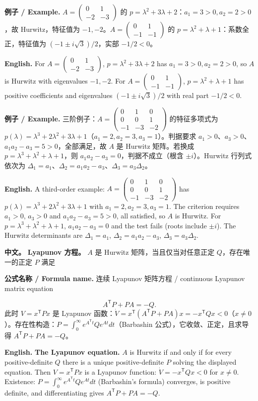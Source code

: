 \documentclass[UTF8,11pt,a4paper]{ctexart}
\newcommand{\EN}[1]{\par\noindent\textbf{English.} #1\par}
\newcommand{\FORMULA}[2]{\par\noindent\textbf{公式名称 / Formula name.} #1 / #2\par}
\newcommand{\EX}[2]{\par\noindent\textbf{例子 / Example.} #1\par\EN{#2}}
\newcommand{\APS}[2]{\par\noindent\textbf{中文。} #1\par\noindent\textbf{English.} #2\par}
\begin{document}
\EX{$A=\begin{pmatrix}0&1\\-2&-3\end{pmatrix}$ 的 $p=\lambda^2+3\lambda+2$：$a_1=3>0,a_2=2>0$，故 Hurwitz，特征值为 $-1,-2$。$A=\begin{pmatrix}0&1\\-1&-1\end{pmatrix}$ 的 $p=\lambda^2+\lambda+1$：系数全正，特征值为 $(-1\pm i\sqrt3)/2$，实部 $-1/2<0$。}{For $A=\begin{pmatrix}0&1\\-2&-3\end{pmatrix}$, $p=\lambda^2+3\lambda+2$ has $a_1=3>0,a_2=2>0$, so $A$ is Hurwitz with eigenvalues $-1,-2$. For $A=\begin{pmatrix}0&1\\-1&-1\end{pmatrix}$, $p=\lambda^2+\lambda+1$ has positive coefficients and eigenvalues $(-1\pm i\sqrt3)/2$ with real part $-1/2<0$.}

\EX{三阶例子：$A=\begin{pmatrix}0&1&0\\0&0&1\\-1&-3&-2\end{pmatrix}$ 的特征多项式为 $p(\lambda)=\lambda^3+2\lambda^2+3\lambda+1$（$a_1=2,a_2=3,a_3=1$）。判据要求 $a_1>0$、$a_3>0$、$a_1a_2-a_3=5>0$，全部满足，故 $A$ 是 Hurwitz 矩阵。若换成 $p=\lambda^3+\lambda^2+\lambda+1$，则 $a_1a_2-a_3=0$，判据不成立（根含 $\pm i$）。Hurwitz 行列式依次为 $\Delta_1=a_1$、$\Delta_2=a_1a_2-a_3$、$\Delta_3=a_3\Delta_2$。}{A third-order example: $A=\begin{pmatrix}0&1&0\\0&0&1\\-1&-3&-2\end{pmatrix}$ has $p(\lambda)=\lambda^3+2\lambda^2+3\lambda+1$ with $a_1=2,a_2=3,a_3=1$. The criterion requires $a_1>0$, $a_3>0$ and $a_1a_2-a_3=5>0$, all satisfied, so $A$ is Hurwitz. For $p=\lambda^3+\lambda^2+\lambda+1$, $a_1a_2-a_3=0$ and the test fails (roots include $\pm i$). The Hurwitz determinants are $\Delta_1=a_1$, $\Delta_2=a_1a_2-a_3$, $\Delta_3=a_3\Delta_2$.}

\APS{\textbf{Lyapunov 方程。} $A$ 是 Hurwitz 矩阵，当且仅当对任意正定 $Q$，存在唯一的正定 $P$ 满足
\FORMULA{连续 Lyapunov 矩阵方程}{continuous Lyapunov matrix equation}
\[
A^{\mathsf T}P+PA=-Q .
\]
此时 $V=x^{\mathsf T}Px$ 是 Lyapunov 函数：$\dot V=x^{\mathsf T}(A^{\mathsf T}P+PA)x=-x^{\mathsf T}Qx<0$（$x\ne0$）。存在性构造：$P=\int_0^\infty e^{A^{\mathsf T}t}Qe^{At}dt$（Barbashin 公式），它收敛、正定，且求导得 $A^{\mathsf T}P+PA=-Q$。}{\textbf{The Lyapunov equation.} $A$ is Hurwitz if and only if for every positive-definite $Q$ there is a unique positive-definite $P$ solving the displayed equation. Then $V=x^{\mathsf T}Px$ is a Lyapunov function: $\dot V=-x^{\mathsf T}Qx<0$ for $x\ne0$. Existence: $P=\int_0^\infty e^{A^{\mathsf T}t}Qe^{At}dt$ (Barbashin's formula) converges, is positive definite, and differentiating gives $A^{\mathsf T}P+PA=-Q$.}
\end{document}
